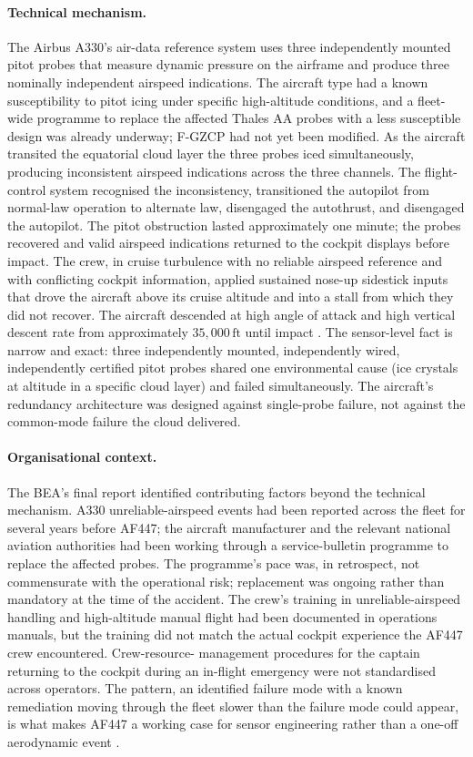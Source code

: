 \paragraph{Technical mechanism.} The Airbus A330's air-data
reference system uses three independently mounted pitot probes that
measure dynamic pressure on the airframe and produce three nominally
independent airspeed indications. The aircraft type had a known
susceptibility to pitot icing under specific high-altitude
conditions, and a fleet-wide programme to replace the affected
Thales AA probes with a less susceptible design was already
underway; F-GZCP had not yet been modified. As the aircraft
transited the equatorial cloud layer the three probes iced
simultaneously, producing inconsistent airspeed indications across
the three channels. The flight-control system recognised the
inconsistency, transitioned the autopilot from normal-law operation
to alternate law, disengaged the autothrust, and disengaged the
autopilot. The pitot obstruction lasted approximately one minute;
the probes recovered and valid airspeed indications returned to the
cockpit displays before impact. The crew, in cruise turbulence with
no reliable airspeed reference and with conflicting cockpit
information, applied sustained nose-up sidestick inputs that drove
the aircraft above its cruise altitude and into a stall from which
they did not recover. The aircraft descended at high angle of attack
and high vertical descent rate from approximately $35{,}000 \,\text
{ft}$ until impact \cite{acc:bea-af447}. The sensor-level fact is
narrow and exact: three independently mounted, independently wired,
independently certified pitot probes shared one environmental cause
(ice crystals at altitude in a specific cloud layer) and failed
simultaneously. The aircraft's redundancy architecture was designed
against single-probe failure, not against the common-mode failure
the cloud delivered.

\paragraph{Organisational context.} The BEA's final report
identified contributing factors beyond the technical mechanism. A330
unreliable-airspeed events had been reported across the fleet for
several years before AF447; the aircraft manufacturer and the
relevant national aviation authorities had been working through a
service-bulletin programme to replace the affected probes. The
programme's pace was, in retrospect, not commensurate with the
operational risk; replacement was ongoing rather than mandatory at
the time of the accident. The crew's training in unreliable-airspeed
handling and high-altitude manual flight had been documented in
operations manuals, but the training did not match the actual
cockpit experience the AF447 crew encountered. Crew-resource-
management procedures for the captain returning to the cockpit
during an in-flight emergency were not standardised across
operators. The pattern, an identified failure mode with a known
remediation moving through the fleet slower than the failure mode
could appear, is what makes AF447 a working case for sensor
engineering rather than a one-off aerodynamic event
\cite{acc:bea-af447}.

